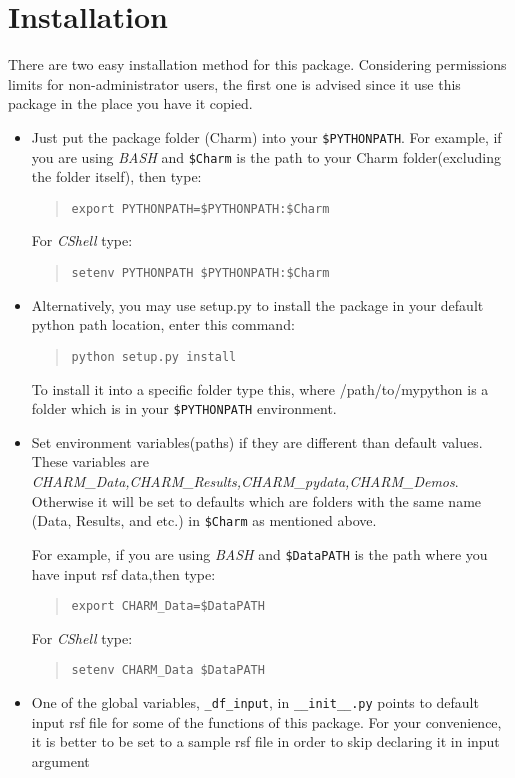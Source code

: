 \documentclass[12pt,titlepage]{article}
\begin{document}
\section*{Installation}
There are two easy installation method for this package. Considering
permissions limits for non-administrator users, the first one is
advised since it use this package in the place you have it copied.
\begin{itemize}

\item Just put the package folder (Charm) into your
  \texttt{\$PYTHONPATH}. For example, if you are using
  \small{\textit{BASH}} and \texttt{\$Charm} is the path to your Charm
  folder(excluding the folder itself), then type:
	\begin{verse}
          \texttt{export PYTHONPATH=\$PYTHONPATH:\$Charm}
	\end{verse}
        \quad For \textit{CShell} type:
	\begin{verse}
          \texttt{setenv PYTHONPATH \${PYTHONPATH}:\$Charm}
	\end{verse}

      \item Alternatively, you may use setup.py to install the package
        in your default python path location, enter this command:
	\begin{verse}
		\texttt{python setup.py install}
	\end{verse}

        To install it into a specific folder type this, where
        /path/to/mypython is a folder which is in your
        \texttt{\$PYTHONPATH} environment.

      \item Set environment variables(paths) if they are different
        than default values. These variables are
        \emph{CHARM\_Data,CHARM\_Results,CHARM\_pydata,CHARM\_Demos}. Otherwise
        it will be set to defaults which are folders with the same
        name (Data, Results, and etc.) in \texttt{\$Charm} as
        mentioned above.
  
For example, if you are using \small{\textit{BASH}} and \texttt{\$DataPATH} is the path where you have input rsf data,then type:
%
\begin{verse}
  \texttt{export CHARM\_Data=\$DataPATH}
\end{verse}
\quad For \textit{CShell} type:
\begin{verse}
  \texttt{setenv CHARM\_Data \$DataPATH}
\end{verse}
%
\item One of the global variables,  \texttt{\_df\_input}, in \texttt{\_\_init\_\_.py} points to default input rsf file for some of the functions of this package. For your convenience, it is better to be set to a sample rsf file in order to skip declaring it in input argument

\end{itemize}
%
%
\newpage
\end{document}
